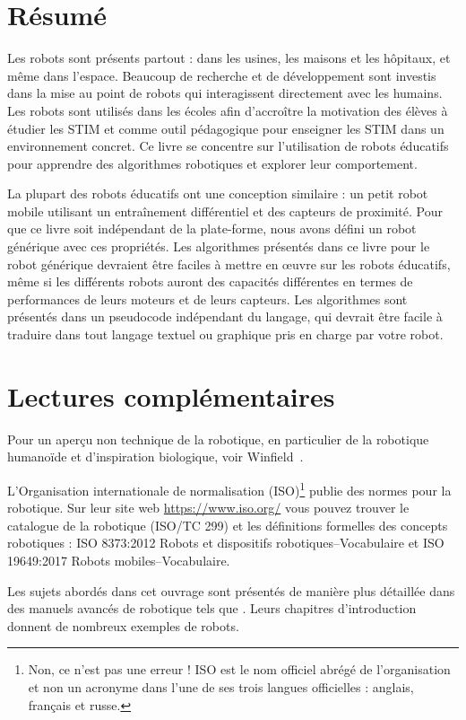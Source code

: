 \section{Résumé}

Les robots sont présents partout : dans les usines, les maisons et les hôpitaux, et même dans l'espace. Beaucoup de recherche et de développement sont investis dans la mise au point de robots qui interagissent directement avec les humains. Les robots sont utilisés dans les écoles afin d'accroître la motivation des élèves à étudier les STIM et comme outil pédagogique pour enseigner les STIM dans un environnement concret. Ce livre se concentre sur l'utilisation de robots éducatifs pour apprendre des algorithmes robotiques et explorer leur comportement.

La plupart des robots éducatifs ont une conception similaire : un petit robot mobile utilisant un entraînement différentiel et des capteurs de proximité. Pour que ce livre soit indépendant de la plate-forme, nous avons défini un robot générique avec ces propriétés. Les algorithmes présentés dans ce livre pour le robot générique devraient être faciles à mettre en œuvre sur les robots éducatifs, même si les différents robots auront des capacités différentes en termes de performances de leurs moteurs et de leurs capteurs. Les algorithmes sont présentés dans un pseudocode indépendant du langage, qui devrait être facile à traduire dans tout langage textuel ou graphique pris en charge par votre robot.

\section{Lectures complémentaires}

Pour un aperçu non technique de la robotique, en particulier de la robotique humanoïde et d'inspiration biologique, voir Winfield~\cite{vsi}.

L'Organisation internationale de normalisation (ISO)\footnote{Non, ce n'est pas une erreur ! ISO est le nom officiel abrégé de l'organisation et non un acronyme dans l'une de ses trois langues officielles : anglais, français et russe.} publie des normes pour la robotique. Sur leur site web \url{https://www.iso.org/} vous pouvez trouver le catalogue de la robotique (ISO/TC 299) et les définitions formelles des concepts robotiques : ISO 8373:2012 Robots et dispositifs robotiques--Vocabulaire et ISO 19649:2017 Robots mobiles--Vocabulaire.

Les sujets abordés dans cet ouvrage sont présentés de manière plus détaillée dans des manuels avancés de robotique tels que \cite{dudek,siegwart}. Leurs chapitres d'introduction donnent de nombreux exemples de robots.

